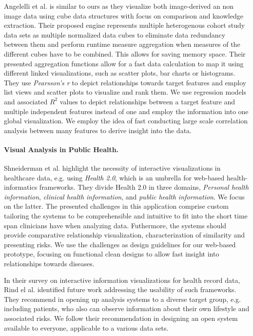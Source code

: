 \documentclass[journal]{style/vgtc} 			          %
\begin{document}
Angelelli et al. \cite{Angelelli} is similar to ours as they visualize both image-derived an non image data using cube data structures with focus on comparison and knowledge extraction.
Their proposed engine represents multiple heterogenous cohort study data sets as multiple normalized data cubes to eliminate data redundancy between them and perform runtime measure aggregation when measures of the different cubes have to be combined.
This allows for saving memory space.
Their presented aggregation functions allow for a fast data calculation to map it using different linked visualizations, such as scatter plots, bar charts or histograms.
They use \emph{Pearsson's r} to depict relationships towards target features and employ list views and scatter plots to visualize and rank them.
We use regression models and associated $R^2$ values to depict relationships between a target feature and multiple independent features instead of one and employ the information into one global visualization.
We employ the idea of fast conducting large scale correlation analysis between many features to derive insight into the data.

\paragraph{Visual Analysis in Public Health.}
Shneiderman et al. \cite{Shneiderman2013} highlight the necessity of interactive visualizations in healthcare data, e.g. using \emph{Health 2.0}, which is an umbrella for web-based health-informatics frameworks.
They divide Health 2.0 in three domains, \emph{Personal health information}, \emph{clinical health information}, and \emph{public health information}.
We focus on the latter.
The presented challenges in this application comprise custom tailoring the systems to be comprehensible and intuitive to fit into the short time span clinicians have when analyzing data.
Futhermore, the systems should provide comparative relationship visualization, characterization of similarity and presenting risks.
We use the challenges as design guidelines for our web-based prototype, focusing on functional clean designs to allow fast insight into relationships towards diseases.

In their survey on interactive information visualizations for health record data, Rind el al. \cite{Rind} identified future work addressing the usability of such frameworks.
They recommend in opening up analysis systems to a diverse target group, e.g. including patients, who also can observe information about their own lifestyle and associated risks.
We follow their recommendation in designing an open system available to everyone, applicable to a various data sets.
\end{document}
